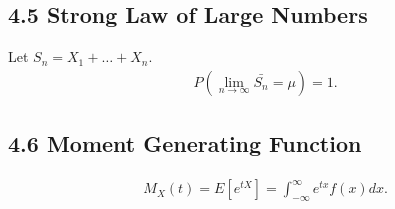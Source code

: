 \documentclass{article}
\begin{document}
\subsection*{4.5 Strong Law of Large Numbers}
Let $S_n = X_1 + \dots + X_n$.
\begin{align}
    & P(\lim_{n\rightarrow\infty}\bar{S_n}=\mu) = 1. \nonumber
\end{align}

\subsection*{4.6 Moment Generating Function}
\begin{align}
    & M_X(t) = E[e^{tX}] = \int_{-\infty}^\infty e^{tx}f(x)dx. \nonumber
\end{align}
\end{document}
